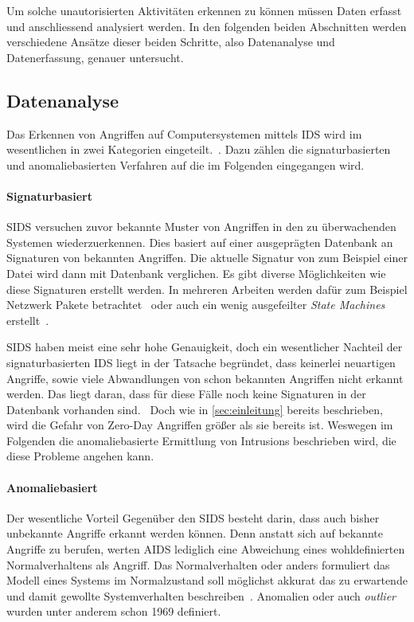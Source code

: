        Um solche unautorisierten Aktivitäten erkennen zu können müssen Daten erfasst und anschliessend analysiert werden.
        In den folgenden beiden Abschnitten werden verschiedene Ansätze dieser beiden Schritte, also Datenanalyse und Datenerfassung, genauer untersucht.

        \subsection{Datenanalyse}\label{sec:Datenanalyse}
            Das Erkennen von Angriffen auf Computersystemen mittels \ac{IDS} wird im wesentlichen in zwei Kategorien eingeteilt.~\cite{IDSreview, IDSsurvey, IDSsurvey2}.
            Dazu zählen die signaturbasierten und anomaliebasierten Verfahren auf die im Folgenden eingegangen wird.

            \paragraph{Signaturbasiert} 
                \ac{SIDS} versuchen zuvor bekannte Muster von Angriffen in den zu überwachenden Systemen wiederzuerkennen.
                Dies basiert auf einer ausgeprägten Datenbank an Signaturen von bekannten Angriffen.
                Die aktuelle Signatur von zum Beispiel einer Datei wird dann mit Datenbank verglichen.
                Es gibt diverse Möglichkeiten wie diese Signaturen erstellt werden. 
                In mehreren Arbeiten werden dafür zum Beispiel Netzwerk Pakete betrachtet~\cite{IDSsurvey}
                oder auch ein wenig ausgefeilter \textit{State Machines} erstellt~\cite{SIDSstate}.

                \ac{SIDS} haben meist eine sehr hohe Genauigkeit, doch ein wesentlicher Nachteil der signaturbasierten IDS liegt in der Tatsache begründet,
                dass keinerlei neuartigen Angriffe, sowie viele Abwandlungen von schon bekannten Angriffen nicht erkannt werden.
                Das liegt daran, dass für diese Fälle noch keine Signaturen in der Datenbank vorhanden sind.~\cite{IDSPIETRO2008}
                Doch wie in \autoref{sec:einleitung} bereits beschrieben, wird die Gefahr von Zero-Day Angriffen größer als sie bereits ist.
                Weswegen im Folgenden die anomaliebasierte Ermittlung von Intrusions beschrieben wird, die diese Probleme angehen kann.

            \paragraph{Anomaliebasiert}
                Der wesentliche Vorteil Gegenüber den \ac{SIDS} besteht darin, dass auch bisher unbekannte Angriffe erkannt werden können.
                Denn anstatt sich auf bekannte Angriffe zu berufen, werten \ac{AIDS} lediglich eine Abweichung eines wohldefinierten Normalverhaltens als Angriff.
                Das Normalverhalten oder anders formuliert das Modell eines Systems im Normalzustand soll möglichst akkurat das zu erwartende und damit gewollte Systemverhalten beschreiben~\cite{ANOMALYBOOKKISHAN2017}.
                Anomalien oder auch \textit{\glqq outlier\grqq\ } wurden unter anderem schon 1969 definiert.

